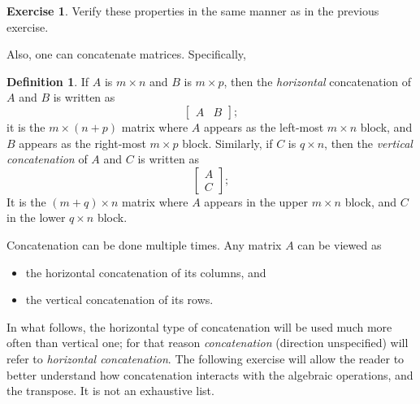 \documentclass[11pt,notitlepage]{article}
\numberwithin{equation}{section}
\theoremstyle{plain}
\theoremstyle{definition}
\newtheorem{definition}[equation]{Definition}
\newtheorem{exercise}[equation]{Exercise}
\begin{document}
\begin{exercise} Verify these properties in the same manner as in the previous exercise.
\end{exercise}

Also, one can concatenate matrices. Specifically,

\begin{definition} If $A$ is $m\times n$ and $B$ is $m\times p$, then the {\it horizontal} concatenation of $A$ and $B$ is written as
\[
\begin{bmatrix} 
A & B
\end{bmatrix};
\] 
it is the $m\times (n+p)$ matrix where $A$ appears as the left-most $m\times n$ block, and $B$ appears as the right-most $m\times p$ block. Similarly, if $C$ is $q\times n$, then the {\it vertical concatenation} of $A$ and $C$ is written as
\[
\begin{bmatrix} 
A\\ C
\end{bmatrix};
\]
It is the $(m+q)\times n$ matrix where $A$ appears in the upper $m\times n$ block, and $C$ in the lower $q\times n$ block.
\end{definition}
Concatenation can be done multiple times. Any matrix $A$ can be viewed as 
\begin{itemize}
\item the horizontal concatenation of its columns, and
\item the vertical concatenation of its rows.
\end{itemize}

In what follows, the horizontal type of concatenation will be used much more often than vertical one; for that reason {\it concatenation} (direction unspecified) will refer to {\it horizontal concatenation}. The following exercise will allow the reader to better understand how concatenation interacts with the algebraic operations, and the transpose. It is not an exhaustive list.
\end{document}
